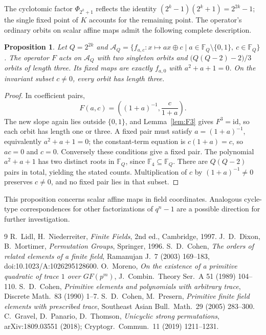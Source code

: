 \documentclass[11pt]{article}
\newtheorem{proposition}[theorem]{Proposition}
\begin{document}
The cyclotomic factor $\Phi_{2^k+1}$ reflects the identity
$(2^k-1)(2^k+1)=2^{2k}-1$; the single fixed point of $K$ accounts for the
remaining point. The operator's ordinary orbits on scalar affine maps admit
the following complete description.
\begin{proposition}\label{prop:F-orbits}
Let $Q=2^{2k}$ and
$\mathcal A_Q=\{f_{a,c}:x\mapsto ax\oplus c\mid a\in\mathbb F_Q\setminus\{0,1\},\ c\in\mathbb F_Q\}$.
The operator $F$ acts on $\mathcal A_Q$ with two singleton orbits and
$\bigl(Q(Q-2)-2\bigr)/3$ orbits of length three. Its fixed maps are exactly
$f_{a,0}$ with $a^2+a+1=0$. On the invariant subset $c\ne0$, every orbit
has length three.
\end{proposition}
\begin{proof}
In coefficient pairs,
\[
F(a,c)=\left((1+a)^{-1},\frac{c}{1+a}\right).
\]
The new slope again lies outside $\{0,1\}$, and Lemma~\ref{lem:F3} gives
$F^3=\mathrm{id}$, so each orbit has length one or three. A fixed pair
must satisfy $a=(1+a)^{-1}$, equivalently $a^2+a+1=0$; the constant-term
equation is $c(1+a)=c$, so $ac=0$ and $c=0$.
Conversely these conditions give a fixed pair. The polynomial $a^2+a+1$
has two distinct roots in $\mathbb F_Q$, since $\mathbb F_4\subseteq\mathbb F_Q$.
There are $Q(Q-2)$ pairs in total, yielding the stated counts.
Multiplication of $c$ by $(1+a)^{-1}\ne0$ preserves $c\ne0$, and no fixed
pair lies in that subset.
\end{proof}
This proposition concerns scalar affine maps in field coordinates.
Analogous cycle-type correspondences for other factorizations of $q^n-1$
are a possible direction for further investigation.

\begin{thebibliography}{9}
 R.~Lidl, H.~Niederreiter, \emph{Finite Fields}, 2nd ed., Cambridge, 1997.
 J.~D.~Dixon, B.~Mortimer, \emph{Permutation Groups}, Springer, 1996.
 S.~D.~Cohen, \emph{The orders of related elements of a finite field}, Ramanujan J.~7 (2003) 169--183, doi:10.1023/A:1026295128600.
 O.~Moreno, \emph{On the existence of a primitive quadratic of trace $1$ over $GF(p^m)$}, J.~Combin.~Theory Ser.~A 51 (1989) 104--110.
 S.~D.~Cohen, \emph{Primitive elements and polynomials with arbitrary trace}, Discrete Math.~83 (1990) 1--7.
 S.~D.~Cohen, M.~Presern, \emph{Primitive finite field elements with prescribed trace}, Southeast Asian Bull.~Math.~29 (2005) 283--300.
 C.~Gravel, D.~Panario, D.~Thomson, \emph{Unicyclic strong permutations}, arXiv:1809.03551 (2018); Cryptogr.~Commun.~11 (2019) 1211--1231.
\end{thebibliography}
\end{document}
